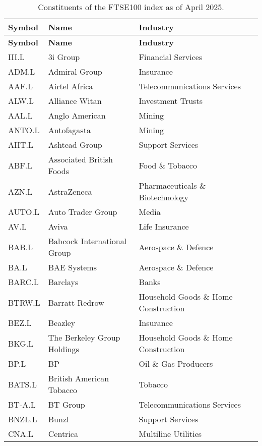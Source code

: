 \begin{longtable}{|p{2cm}|p{4cm}|p{6cm}|}
\caption{Constituents of the FTSE100 index as of April 2025. \cite{FTSE100}}
\label{tab:ftse100constituents}
\\ 
\hline
\textbf{Symbol} & \textbf{Name} & \textbf{Industry} \\ \midrule
\endfirsthead

\hline
\textbf{Symbol} & \textbf{Name} & \textbf{Industry} \\ \midrule
\endhead

\endfoot

\hline
III.L & 3i Group & Financial Services \\ \hline
ADM.L & Admiral Group & Insurance \\ \hline
AAF.L & Airtel Africa & Telecommunications Services \\ \hline
ALW.L & Alliance Witan & Investment Trusts \\ \hline
AAL.L & Anglo American & Mining \\ \hline
ANTO.L & Antofagasta & Mining \\ \hline
AHT.L & Ashtead Group & Support Services \\ \hline
ABF.L & Associated British Foods & Food \& Tobacco \\ \hline
AZN.L & AstraZeneca & Pharmaceuticals \& Biotechnology \\ \hline
AUTO.L & Auto Trader Group & Media \\ \hline
AV.L & Aviva & Life Insurance \\ \hline
BAB.L & Babcock International Group & Aerospace \& Defence \\ \hline
BA.L & BAE Systems & Aerospace \& Defence \\ \hline
BARC.L & Barclays & Banks \\ \hline
BTRW.L & Barratt Redrow & Household Goods \& Home Construction \\ \hline
BEZ.L & Beazley & Insurance \\ \hline
BKG.L & The Berkeley Group Holdings & Household Goods \& Home Construction \\ \hline
BP.L & BP & Oil \& Gas Producers \\ \hline
BATS.L & British American Tobacco & Tobacco \\ \hline
BT-A.L & BT Group & Telecommunications Services \\ \hline
BNZL.L & Bunzl & Support Services \\ \hline
CNA.L & Centrica & Multiline Utilities \\ \hline

\end{longtable}
